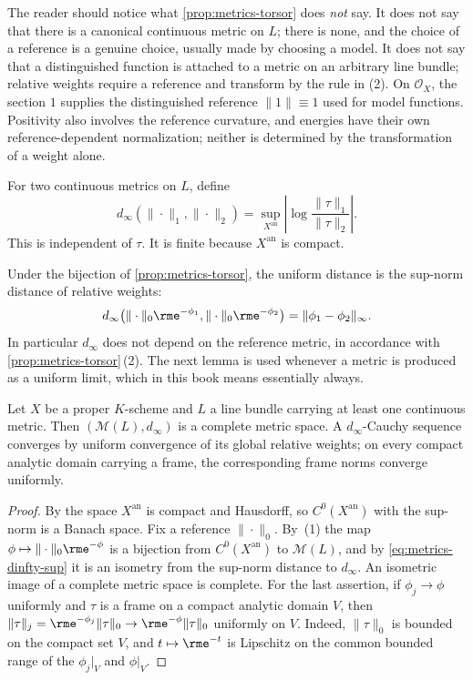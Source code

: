 The reader should notice what \cref{prop:metrics-torsor} does \emph{not}
say. It does not say that there is a canonical continuous metric on $L$;
there is none, and the choice of a reference is a genuine choice, usually
made by choosing a model. It does not say that a distinguished function is
attached to a metric on an arbitrary line bundle; relative weights require
a reference and transform by the rule in (2). On $\mathcal O_X$, the
section $1$ supplies the distinguished reference $\|1\|\equiv1$ used for
model functions. Positivity also involves the reference curvature, and
energies have their own reference-dependent normalization; neither is
determined by the transformation of a weight alone.

\begin{definition}
\label{def:metrics-uniform-distance}
For two continuous metrics on $L$, define
\[
 d_\infty(\|\cdot\|_1,\|\cdot\|_2)
 =\sup_{X^{\mathrm{an}}}
    \left|\log\frac{\|\tau\|_1}{\|\tau\|_2}\right|.
\]
This is independent of $\tau$. It is finite because $X^{\mathrm{an}}$
is compact.
\end{definition}

Under the bijection of \cref{prop:metrics-torsor}, the uniform distance is
the sup-norm distance of relative weights:
\begin{equation}
\label{eq:metrics-dinfty-sup}
 d_\infty\bigl(\|\cdot\|_0\rme^{-\phi_1},\|\cdot\|_0\rme^{-\phi_2}\bigr)
 =\|\phi_1-\phi_2\|_\infty .
\end{equation}
In particular $d_\infty$ does not depend on the reference metric, in
accordance with \cref{prop:metrics-torsor}\,(2). The next lemma is used
whenever a metric is produced as a uniform limit, which in this book means
essentially always.

\begin{lemma}
\label{lem:metrics-dinfty-complete}
Let $X$ be a proper $K$-scheme and $L$ a line bundle carrying at least
one continuous metric. Then $(\mathcal M(L),d_\infty)$ is a complete
metric space. A $d_\infty$-Cauchy sequence converges by uniform convergence
of its global relative weights; on every compact analytic domain carrying a
frame, the corresponding frame norms converge uniformly.
\end{lemma}

\begin{proof}
By  the space $X^{\mathrm{an}}$ is compact
and Hausdorff, so $C^0(X^{\mathrm{an}})$ with the sup-norm is a Banach
space. Fix a reference $\|\cdot\|_0$. By \,(1)
the map $\phi\mapsto\|\cdot\|_0\rme^{-\phi}$ is a bijection from
$C^0(X^{\mathrm{an}})$ to $\mathcal M(L)$, and by
\eqref{eq:metrics-dinfty-sup} it is an isometry from the sup-norm distance
to $d_\infty$. An isometric image of a complete metric space is complete.
For the last assertion, if $\phi_j\to\phi$ uniformly and $\tau$ is a
frame on a compact analytic domain $V$, then
$\|\tau\|_j=\rme^{-\phi_j}\|\tau\|_0\to\rme^{-\phi}\|\tau\|_0$ uniformly
on $V$. Indeed, $\|\tau\|_0$ is bounded on the compact set $V$, and
$t\mapsto\rme^{-t}$ is Lipschitz on the common bounded range of the
$\phi_j|_V$ and $\phi|_V$.
\end{proof}

